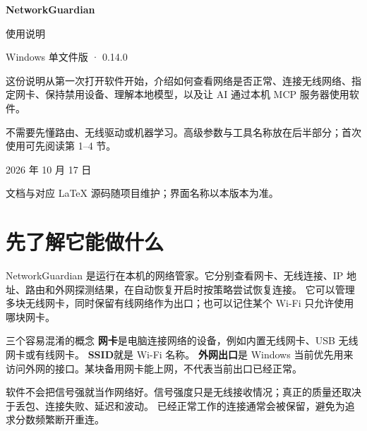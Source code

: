 \documentclass[UTF8,fontset=fandol,11pt,a4paper]{ctexart}
\begin{document}
\begin{titlepage}
\centering
\vspace*{22mm}
{\Huge\bfseries NetworkGuardian\par}
\vspace{8mm}
{\LARGE 使用说明\par}
\vspace{5mm}
{\large Windows 单文件版 · 0.14.0\par}
\vspace{17mm}
\begin{minipage}{0.82\textwidth}
这份说明从第一次打开软件开始，介绍如何查看网络是否正常、连接无线网络、指定网卡、保持禁用设备、理解本地模型，以及让 AI 通过本机 MCP 服务器使用软件。

不需要先懂路由、无线驱动或机器学习。高级参数与工具名称放在后半部分；首次使用可先阅读第 1--4 节。
\end{minipage}
\vfill
{\large 2026 年 10 月 17 日\par}
\vspace{5mm}
{\small 文档与对应 LaTeX 源码随项目维护；界面名称以本版本为准。\par}
\end{titlepage}
\begingroup\small\setlength{\parskip}{0pt}\tableofcontents\endgroup
\clearpage
{}

\section{先了解它能做什么}

NetworkGuardian 是运行在本机的网络管家。它分别查看网卡、无线连接、IP 地址、路由和外网探测结果，在自动恢复开启时按策略尝试恢复连接。
它可以管理多块无线网卡，同时保留有线网络作为出口；也可以记住某个 Wi-Fi 只允许使用哪块网卡。

\begin{guidebox}{三个容易混淆的概念}
\textbf{网卡}是电脑连接网络的设备，例如内置无线网卡、USB 无线网卡或有线网卡。
\textbf{SSID}就是 Wi-Fi 名称。
\textbf{外网出口}是 Windows 当前优先用来访问外网的接口。某块备用网卡能上网，不代表当前出口已经正常。
\end{guidebox}

软件不会把信号强就当作网络好。信号强度只是无线接收情况；真正的质量还取决于丢包、连接失败、延迟和波动。
已经正常工作的连接通常会被保留，避免为追求分数频繁断开重连。
\end{document}
